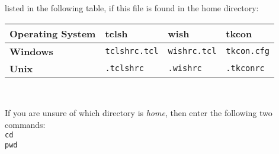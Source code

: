   listed in the following table, if this file is found in the home
  directory:
  \\ \par \begin{tabular}{|l||l|l|l|}
    \hline 
      \textbf{Operating System} & 
      \textbf{tclsh} & 
      \textbf{wish} & 
      \textbf{tkcon}
    \\
    \hline 
    \hline 
        \textbf{Windows}
       & 
        \texttt{tclshrc.tcl}
       & 
        \texttt{wishrc.tcl}
       & 
        \texttt{tkcon.cfg}
    \\
    \hline 
        \textbf{Unix}
       & 
        \texttt{.tclshrc}
       & 
        \texttt{.wishrc}
       & 
        \texttt{.tkconrc}
    \\
  \hline
\end{tabular} \\ \par
  \par If you are unsure of which directory is 
  \emph{home}, then enter the following two commands: 
  \texttt{
  \\cd
  \\pwd}
